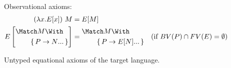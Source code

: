 \documentclass[runningheads]{llncs}
\begin{document}
\begin{figure}
Observational axioms:
\begin{align*}
  (\lambda x. E[x]) ~ M
  &=
  E[M]
  \\
  E\left[
    \begin{aligned}
      &\Match M \With \\
      &\qquad\set{\many{P \to N}}
    \end{aligned}
  \right]
  &=
  \begin{aligned}
    &\Match M \With \\
    &\qquad \set{\many{P \to E[N]}}
  \end{aligned}
  &(\text{if } BV(P) \cap FV(E) = \emptyset)
\end{align*}
\caption{Untyped equational axioms of the target language.}
\label{fig:target-equality}
\end{figure}
\end{document}
